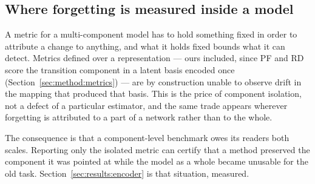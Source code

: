 \subsection{Where forgetting is measured inside a model}
\label{sec:related:locus}

A metric for a multi-component model has to hold something fixed in order to
attribute a change to anything, and what it holds fixed bounds what it can
detect. Metrics defined over a representation --- ours included, since PF and RD
score the transition component in a latent basis encoded once
(Section~\ref{sec:method:metrics}) --- are by construction unable to observe
drift in the mapping that produced that basis. This is the price of component
isolation, not a defect of a particular estimator, and the same trade appears
wherever forgetting is attributed to a part of a network rather than to the
whole.

The consequence is that a component-level benchmark owes its readers both
scales. Reporting only the isolated metric can certify that a method preserved
the component it was pointed at while the model as a whole became unusable for
the old task. Section~\ref{sec:results:encoder} is that situation, measured.
